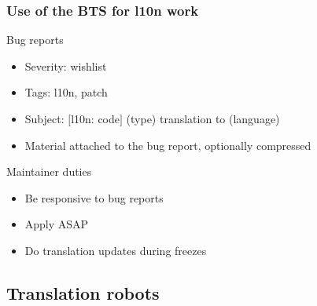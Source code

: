 \documentclass{beamer}
\begin{document}
\begin{frame}
  \frametitle{Use of the BTS for l10n work}
	\begin{block}
		{Bug reports}
		\begin{itemize}
		\item
			Severity: wishlist
		\item
			Tags: l10n, patch
		\item
			Subject: $[$l10n: code$]$ (type) translation to (language)
		\item
			Material attached to the bug report, optionally compressed
		\end{itemize}
	\end{block}
	\begin{block}
		{Maintainer duties}
		\begin{itemize}
		\item
		{Be responsive to bug reports}
		\item
		{Apply ASAP}
		\item
		{Do translation updates during freezes}
		\end{itemize}
	\end{block}
\end{frame}


%
%

\subsection{Translation robots}
\end{document}
